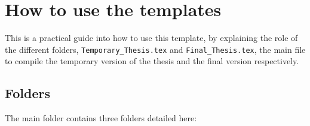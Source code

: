 \chapter{How to use the templates} \label{ch-2}

This is a practical guide into how to use this template, by explaining the role of the different folders, \texttt{Temporary\_Thesis.tex} and  \texttt{Final\_Thesis.tex}, the main file to compile the temporary version of the thesis and the final version respectively.

\section{Folders}

The main folder contains three folders detailed here:

